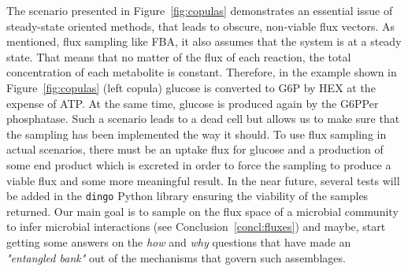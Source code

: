 
   The scenario presented in Figure~\ref{fig:copulas} 
   demonstrates an essential issue of steady-state oriented methods,  
   that leads to obscure, non-viable flux vectors. 
   As mentioned, flux sampling like FBA, it also assumes that the system is at a steady state.
   That means that no matter of the flux of each reaction, 
   the total concentration of each metabolite is constant.
   Therefore, in the example shown in Figure~\ref{fig:copulas} (left copula) 
   glucose is converted to G6P by HEX at the expense of ATP.
   At the same time, glucose is produced again by the G6PPer phosphatase. 
   Such a scenario leads to a dead cell but allows us to make sure that the sampling has been implemented
   the way it should.
   To use flux sampling in actual scenarios, there must be
   an uptake flux for glucose and a production of some end product which is
   excreted in order to force the sampling to produce a viable flux and some
   more meaningful result. 
   In the near future, several tests will be added in the \texttt{dingo}
   Python library ensuring the viability of the samples returned. 
   Our main goal is to sample on the flux space of a microbial community
   to infer microbial interactions (see Conclusion~\ref{concl:fluxes}) and maybe, 
   start getting some answers on the \textit{how} and \textit{why} questions
   that have made an \textit{"entangled bank"} out of the mechanisms that govern such assemblages. 

